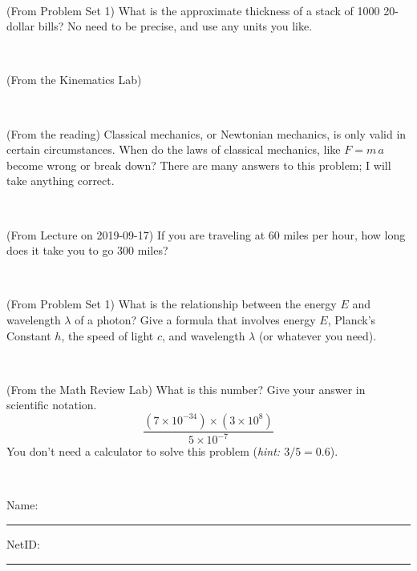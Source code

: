 \documentclass[12pt, letterpaper]{article}
\begin{document}
\vfill ~

\begin{problem} (From Problem Set 1)
What is the approximate thickness of a stack of 1000 20-dollar bills?
No need to be precise, and use any units you like.
\end{problem}


\vfill ~

\begin{problem} (From the Kinematics Lab)

\end{problem}


\vfill ~


\clearpage


\begin{problem} (From the reading)
Classical mechanics, or Newtonian mechanics, is only valid in certain
circumstances. When do the laws of classical mechanics, like $F =
m\,a$ become wrong or break down? There are many answers to this
problem; I will take anything correct.
\end{problem}


\vfill ~

\begin{problem} (From Lecture on 2019-09-17)
If you are traveling at 60 miles per hour, how long does
it take you to go 300 miles?
\end{problem}


\vfill ~

\begin{problem} (From Problem Set 1)
What is the relationship between the energy $E$ and wavelength
$\lambda$ of a photon? Give a formula that involves energy $E$,
Planck's Constant $h$, the speed of light $c$, and wavelength
$\lambda$ (or whatever you need).
\end{problem}

\vfill ~

\begin{problem} (From the Math Review Lab)
What is this number? Give your answer in scientific notation.
$$
\frac{(7\times10^{-34})\times(3\times10^8)}{5\times10^{-7}}
$$
You don't need a calculator to solve this problem (\textit{hint: $3/5=0.6$}).
\end{problem}


\vfill ~


\cleardoublepage



\noindent
Name: \rule[-1ex]{0.60\textwidth}{0.1pt}
NetID: \rule[-1ex]{0.20\textwidth}{0.1pt}
\end{document}
